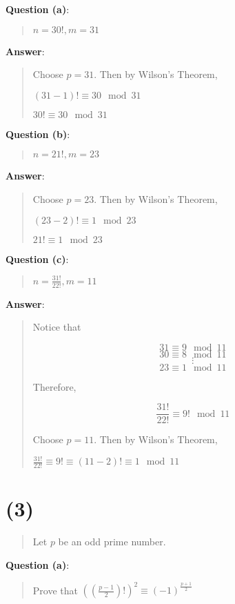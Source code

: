\documentclass{article} %
\begin{document}
\bigskip
\noindent
\textbf{Question (a)}:
\begin{quote}
    $n = 30!, m = 31$
\end{quote}

\bigskip
\noindent
\textbf{Answer}:
\begin{quote}
    Choose $p = 31$. Then by Wilson's Theorem,

    $(31 - 1)! \equiv 30 \mod 31$

    $\boxed{30! \equiv 30 \mod 31}$

\end{quote}

\bigskip
\noindent
\textbf{Question (b)}:
\begin{quote}
    $n = 21!, m = 23$
\end{quote}

\bigskip
\noindent
\textbf{Answer}:
\begin{quote}
    Choose $p = 23$. Then by Wilson's Theorem,

    $(23 - 2)! \equiv 1 \mod 23$

    $\boxed{21! \equiv 1 \mod 23}$

\end{quote}

\bigskip
\noindent
\textbf{Question (c)}:
\begin{quote}
    $n = \frac{31!}{22!}, m = 11$
\end{quote}

\bigskip
\noindent
\textbf{Answer}:
\begin{quote}
    Notice that

    \[31 \equiv 9 \mod 11\]
    \[30 \equiv 8 \mod 11\]
    \[\vdots\]
    \[23 \equiv 1 \mod 11\]

    Therefore,

    \[\frac{31!}{22!} \equiv 9! \mod 11\]

    Choose $p = 11$. Then by Wilson's Theorem,

    $\boxed{\frac{31!}{22!} \equiv 9! \equiv (11 - 2)! \equiv 1 \mod 11}$
\end{quote}

\section*{(3)}
\begin{quote}
    Let $p$ be an odd prime number.
\end{quote}

\bigskip
\noindent
\textbf{Question (a)}:
\begin{quote}
    Prove that $\left(\left(\frac{p-1}{2}\right)!\right)^2 \equiv (-1)^{\frac{p + 1}{2}}$
\end{quote}
\end{document}
